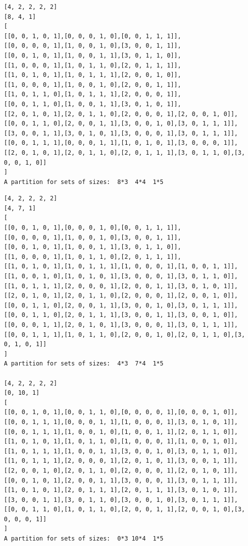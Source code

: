 \documentclass[final]{dmtcs-episciences}
\begin{document}
\begin{appendices}
\begin{verbatim}
[4, 2, 2, 2, 2]
[8, 4, 1]
[
[[0, 0, 1, 0, 1],[0, 0, 0, 1, 0],[0, 0, 1, 1, 1]],
[[0, 0, 0, 0, 1],[1, 0, 0, 1, 0],[3, 0, 0, 1, 1]],
[[0, 0, 1, 0, 1],[1, 0, 0, 1, 1],[3, 0, 1, 1, 0]],
[[1, 0, 0, 0, 1],[1, 0, 1, 1, 0],[2, 0, 1, 1, 1]],
[[1, 0, 1, 0, 1],[1, 0, 1, 1, 1],[2, 0, 0, 1, 0]],
[[1, 0, 0, 0, 1],[1, 0, 0, 1, 0],[2, 0, 0, 1, 1]],
[[1, 0, 1, 1, 0],[1, 0, 1, 1, 1],[2, 0, 0, 0, 1]],
[[0, 0, 1, 1, 0],[1, 0, 0, 1, 1],[3, 0, 1, 0, 1]],
[[2, 0, 1, 0, 1],[2, 0, 1, 1, 0],[2, 0, 0, 0, 1],[2, 0, 0, 1, 0]],
[[0, 0, 1, 1, 0],[2, 0, 0, 1, 1],[3, 0, 0, 1, 0],[3, 0, 1, 1, 1]],
[[3, 0, 0, 1, 1],[3, 0, 1, 0, 1],[3, 0, 0, 0, 1],[3, 0, 1, 1, 1]],
[[0, 0, 1, 1, 1],[0, 0, 0, 1, 1],[1, 0, 1, 0, 1],[3, 0, 0, 0, 1]],
[[2, 0, 1, 0, 1],[2, 0, 1, 1, 0],[2, 0, 1, 1, 1],[3, 0, 1, 1, 0],[3, 0, 0, 1, 0]]
]
A partition for sets of sizes:  8*3  4*4  1*5
\end{verbatim}

\newpage

\begin{verbatim} 
[4, 2, 2, 2, 2]
[4, 7, 1]
[
[[0, 0, 1, 0, 1],[0, 0, 0, 1, 0],[0, 0, 1, 1, 1]],
[[0, 0, 0, 0, 1],[1, 0, 0, 1, 0],[3, 0, 0, 1, 1]],
[[0, 0, 1, 0, 1],[1, 0, 0, 1, 1],[3, 0, 1, 1, 0]],
[[1, 0, 0, 0, 1],[1, 0, 1, 1, 0],[2, 0, 1, 1, 1]],
[[1, 0, 1, 0, 1],[1, 0, 1, 1, 1],[1, 0, 0, 0, 1],[1, 0, 0, 1, 1]],
[[1, 0, 0, 1, 0],[1, 0, 1, 0, 1],[3, 0, 0, 0, 1],[3, 0, 1, 1, 0]],
[[1, 0, 1, 1, 1],[2, 0, 0, 0, 1],[2, 0, 0, 1, 1],[3, 0, 1, 0, 1]],
[[2, 0, 1, 0, 1],[2, 0, 1, 1, 0],[2, 0, 0, 0, 1],[2, 0, 0, 1, 0]],
[[0, 0, 1, 1, 0],[2, 0, 0, 1, 1],[3, 0, 0, 1, 0],[3, 0, 1, 1, 1]],
[[0, 0, 1, 1, 0],[2, 0, 1, 1, 1],[3, 0, 0, 1, 1],[3, 0, 0, 1, 0]],
[[0, 0, 0, 1, 1],[2, 0, 1, 0, 1],[3, 0, 0, 0, 1],[3, 0, 1, 1, 1]],
[[0, 0, 1, 1, 1],[1, 0, 1, 1, 0],[2, 0, 0, 1, 0],[2, 0, 1, 1, 0],[3, 0, 1, 0, 1]]
]
A partition for sets of sizes:  4*3  7*4  1*5

[4, 2, 2, 2, 2]
[0, 10, 1]
[
[[0, 0, 1, 0, 1],[0, 0, 1, 1, 0],[0, 0, 0, 0, 1],[0, 0, 0, 1, 0]],
[[0, 0, 1, 1, 1],[0, 0, 0, 1, 1],[1, 0, 0, 0, 1],[3, 0, 1, 0, 1]],
[[0, 0, 1, 1, 1],[1, 0, 0, 1, 0],[1, 0, 0, 1, 1],[2, 0, 1, 1, 0]],
[[1, 0, 1, 0, 1],[1, 0, 1, 1, 0],[1, 0, 0, 0, 1],[1, 0, 0, 1, 0]],
[[1, 0, 1, 1, 1],[1, 0, 0, 1, 1],[3, 0, 0, 1, 0],[3, 0, 1, 1, 0]],
[[1, 0, 1, 1, 1],[2, 0, 0, 0, 1],[2, 0, 1, 0, 1],[3, 0, 0, 1, 1]],
[[2, 0, 0, 1, 0],[2, 0, 1, 1, 0],[2, 0, 0, 0, 1],[2, 0, 1, 0, 1]],
[[0, 0, 1, 0, 1],[2, 0, 0, 1, 1],[3, 0, 0, 0, 1],[3, 0, 1, 1, 1]],
[[1, 0, 1, 0, 1],[2, 0, 1, 1, 1],[2, 0, 1, 1, 1],[3, 0, 1, 0, 1]],
[[3, 0, 0, 1, 1],[3, 0, 1, 1, 0],[3, 0, 0, 1, 0],[3, 0, 1, 1, 1]],
[[0, 0, 1, 1, 0],[1, 0, 1, 1, 0],[2, 0, 0, 1, 1],[2, 0, 0, 1, 0],[3, 0, 0, 0, 1]]
]
A partition for sets of sizes:  0*3 10*4  1*5



\end{verbatim}
\end{appendices}
\end{document}
